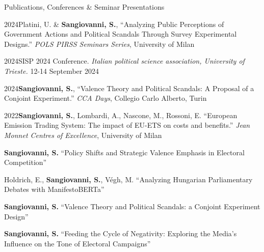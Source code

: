 \documentclass{cv} %
\begin{document}
\begin{rSection}{Publications, Conferences \& Seminar Presentations}
\subtitle{Conferences \& Seminar Presentations}

\begin{rPresSection}{2024}{Platini, U. \& \textbf{Sangiovanni, S.}, “Analyzing Public Perceptions of Government Actions and Political Scandals Through Survey Experimental Designs.” \textit{POLS PIRSS Seminars Series}, University of Milan}
\end{rPresSection}
\begin{rPresSection}{2024}{SISP 2024 Conference. \textit{Italian political science association, University of Trieste.} 12-14 September 2024}
\end{rPresSection}
\begin{rPresSection}{2024}{\textbf{Sangiovanni, S.}, “Valence Theory and Political Scandals: A Proposal of a Conjoint Experiment.” \textit{CCA Days}, Collegio Carlo Alberto, Turin}
\end{rPresSection}
\begin{rPresSection}{2022}{\textbf{Sangiovanni, S.}, Lombardi, A., Nascone, M., Rossoni, E. “European Emission Trading System: The impact of EU-ETS on costs and benefits.” \textit{Jean Monnet Centres of Excellence}, University of Milan}
\end{rPresSection}

\subtitle{Working Papers}

\begin{rWPSection}    
{\textbf{Sangiovanni, S.} “Policy Shifts and Strategic Valence Emphasis in Electoral Competition”} 
\end{rWPSection}
\begin{rWPSection}    
{Holdrich, E., \textbf{Sangiovanni, S.}, Végh, M. “Analyzing Hungarian Parliamentary Debates with ManifestoBERTa”} 
\end{rWPSection}
\begin{rWPSection}
{\textbf{Sangiovanni, S.} “Valence Theory and Political Scandals: a Conjoint Experiment Design”} 
\end{rWPSection}
\begin{rWPSection}
{\textbf{Sangiovanni, S.} “Feeding the Cycle of Negativity: Exploring the Media's Influence on the Tone of Electoral Campaigns”}
\end{rWPSection}
\end{rSection}
\end{document}
